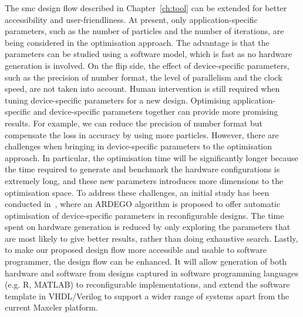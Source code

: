 The \gls{smc} design flow described in Chapter~\ref{ch:tool} can be extended for better accessibility and user-friendliness.
At present, only application-specific parameters, such as the number of particles and the number of iterations, are being considered in the optimisation approach.
The advantage is that the parameters can be studied using a software model, which is fast as no hardware generation is involved.
On the flip side, the effect of device-specific parameters, such as the precision of number format, the level of parallelism and the clock speed, are not taken into account.
Human intervention is still required when tuning device-specific parameters for a new design.
Optimising application-specific and device-specific parameters together can provide more promising results.
For example, we can reduce the precision of number format but compensate the loss in accuracy by using more particles.
However, there are challenges when bringing in device-specific parameters to the optimisation approach.
In particular, the optimisation time will be significantly longer because the time required to generate and benchmark the hardware configurations is extremely long, and these new parameters introduces more dimensions to the optimisation space.
To address these challenges, an initial study has been conducted in~\cite{kurek14fccm}, where an ARDEGO algorithm is proposed to offer automatic optimisation of device-specific parameters in reconfigurable designs.
The time spent on hardware generation is reduced by only exploring the parameters that are most likely to give better results, rather than doing exhaustive search.
Lastly, to make our proposed design flow more accessible and usable to software programmer, the design flow can be enhanced.
It will allow generation of both hardware and software from designs captured in software programming languages (e.g. R, MATLAB) to reconfigurable implementations,
and extend the software template in VHDL/Verilog to support a wider range of systems apart from the current Maxeler platform.


